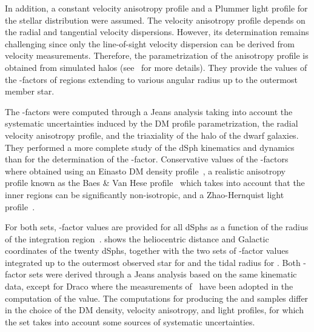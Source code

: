In addition, a constant velocity anisotropy profile and a Plummer light profile \cite{10.1093/mnras/71.5.460} for the stellar distribution were assumed.
The velocity anisotropy profile depends on the radial and tangential velocity dispersions.
However, its determination remains challenging since only the line-of-sight velocity dispersion can be derived from velocity measurements.
Therefore, the parametrization of the anisotropy profile is obtained from simulated halos (see~\cite{Hunter:2013vua} for more details).
They provide the values of the \J-factors of regions extending to various angular radius up to the outermost member star.


The \B \J-factors were computed through a Jeans analysis taking into account the systematic uncertainties induced by the DM profile parametrization, the radial velocity anisotropy profile, and the triaxiality of the halo of the dwarf galaxies.
They performed a more complete study of the dSph kinematics and dynamics than \GS for the determination of the \J-factor.
Conservative values of the \J-factors where obtained using an Einasto DM density profile~\cite{Dhar_2010}, a realistic anisotropy profile known as the Baes \& Van Hese profile~\cite{Baes:2007tx} which takes into account that the inner regions can be significantly non-isotropic, and a Zhao-Hernquist light profile~\cite{Zhao:1995cp}.

For both sets, \J-factor values are provided for all dSphs as a function of the radius of the integration region~\cite{Geringer-Sameth:2014yza,Bonnivard:2014kza,Bonnivard:2015xpq}.
 shows the heliocentric distance and Galactic coordinates of the twenty dSphs, together with the two sets of \J-factor values integrated up to the outermost observed star for \GS and the tidal radius for \B.
Both \J-factor sets were derived through a Jeans analysis based on the same kinematic data, except for Draco where the measurements of~\cite{2015MNRAS.448.2717W} have been adopted in the computation of the \B value.
The computations for producing the \GS and \B samples differ in the choice of the DM density, velocity anisotropy, and light profiles, for which the set \B takes into account some sources of systematic uncertainties.

